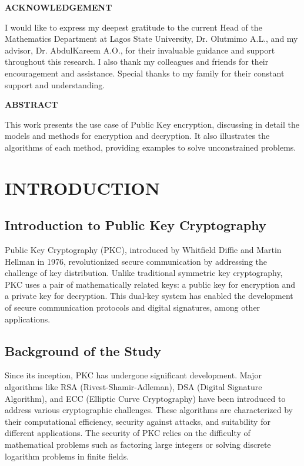 \documentclass[12pt]{report}
\numberwithin{equation}{chapter}
\begin{document}
\pagebreak
{}
\begin{center}
	\textbf{ACKNOWLEDGEMENT}
\end{center}

I would like to express my deepest gratitude to the current Head of the Mathematics Department at Lagos State University, Dr. Olutmimo A.L., and my advisor, Dr. AbdulKareem A.O., for their invaluable guidance and support throughout this research. I also thank my colleagues and friends for their encouragement and assistance. Special thanks to my family for their constant support and understanding.

\newpage

\pagebreak
{}
\begin{center}
	\textbf{ABSTRACT}
\end{center}

This work presents the use case of Public Key encryption, discussing in detail the models and methods for encryption and decryption. It also illustrates the algorithms of each method, providing examples to solve unconstrained problems.




\pagebreak
{}
\tableofcontents

\newpage


\chapter{INTRODUCTION}

\section{Introduction to Public Key Cryptography}
Public Key Cryptography (PKC), introduced by Whitfield Diffie and Martin Hellman in 1976, revolutionized secure communication by addressing the challenge of key distribution. Unlike traditional symmetric key cryptography, PKC uses a pair of mathematically related keys: a public key for encryption and a private key for decryption. This dual-key system has enabled the development of secure communication protocols and digital signatures, among other applications.

\section{Background of the Study}
Since its inception, PKC has undergone significant development. Major algorithms like RSA (Rivest-Shamir-Adleman), DSA (Digital Signature Algorithm), and ECC (Elliptic Curve Cryptography) have been introduced to address various cryptographic challenges. These algorithms are characterized by their computational efficiency, security against attacks, and suitability for different applications. The security of PKC relies on the difficulty of mathematical problems such as factoring large integers or solving discrete logarithm problems in finite fields.
\end{document}
